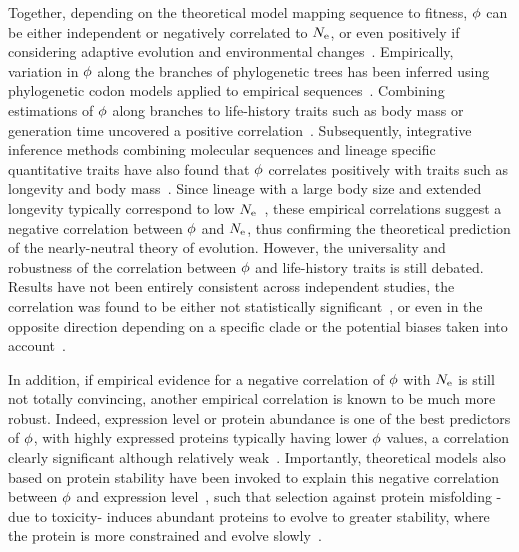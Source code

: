 Together, depending on the theoretical model mapping sequence to fitness, $\phi$ can be either independent or negatively correlated to $N_{\mathrm{e}}$, or even positively if considering adaptive evolution and environmental changes~\citep{Lanfear2014}.
Empirically, variation in $\phi$ along the branches of phylogenetic trees has been inferred using phylogenetic \gls{codon} models applied to empirical sequences~\citep{Yang1998,Zhang2004}.
Combining estimations of $\phi$ along branches to life-history traits such as body mass or generation time uncovered a positive correlation~\citep{Popadin2007, Nikolaev2007}.
Subsequently, integrative inference methods combining molecular sequences and lineage specific quantitative traits have also found that $\phi$ correlates positively with traits such as longevity and body mass~\citep{Lartillot2011, Figuet2017}.
Since lineage with a large body size and extended longevity typically correspond to low $N_{\mathrm{e}}$~\citep{Romiguier2014}, these empirical correlations suggest a negative correlation between $\phi$ and $N_{\mathrm{e}}$, thus confirming the theoretical prediction of the \gls{nearly-neutral} theory of evolution.
However, the universality and robustness of the correlation between $\phi$ and life-history traits is still debated.
Results have not been entirely consistent across independent studies, the correlation was found to be either not statistically significant~\citep{Lartillot2012}, or even in the opposite direction depending on a specific clade or the potential biases taken into account~\citep{Lanfear2010, Nabholz2013, Lanfear2014, Figuet2016}.

In addition, if empirical evidence for a negative correlation of $\phi$ with $N_{\mathrm{e}}$ is still not totally convincing, another empirical correlation is known to be much more robust.
Indeed, expression level or protein abundance is one of the best predictors of $\phi$, with highly expressed proteins typically having lower $\phi$ values, a correlation clearly significant although relatively weak~\citep{Duret2000, Rocha2004, Drummond2005a, Zhang2015, Song2017}.
Importantly, theoretical models also based on protein stability have been invoked to explain this negative correlation between $\phi$ and expression level~\citep{Wilke2006, Drummond2008}, such that selection against protein misfolding -due to toxicity- induces abundant proteins to evolve to greater stability, where the protein is more constrained and evolve slowly~\citep{Serohijos2012}.

